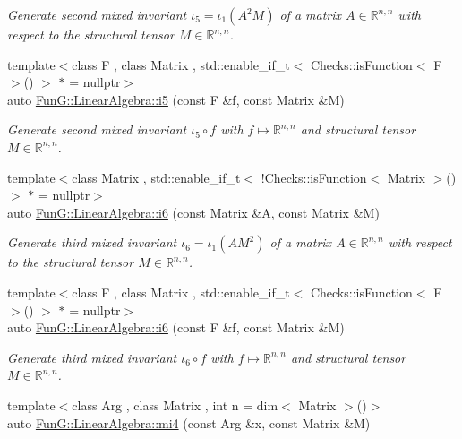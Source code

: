 \begin{DoxyCompactItemize}
\begin{DoxyCompactList}\small\item\em Generate second mixed invariant $ \iota_5=\iota_1(A^2M) $ of a matrix $A\in\mathbb{R}^{n,n}$ with respect to the structural tensor $M\in\mathbb{R}^{n,n}$. \end{DoxyCompactList}\item 
{\footnotesize template$<$class F , class Matrix , std\+::enable\+\_\+if\+\_\+t$<$ Checks\+::is\+Function$<$ F $>$() $>$ $\ast$  = nullptr$>$ }\\auto \hyperlink{group__InvariantGroup_gaed7e47c39d89f2b01e25c992da78b44d}{Fun\+G\+::\+Linear\+Algebra\+::i5} (const F \&f, const Matrix \&M)
\begin{DoxyCompactList}\small\item\em Generate second mixed invariant $ \iota_5\circ f $ with $f\mapsto\mathbb{R}^{n,n}$ and structural tensor $M\in\mathbb{R}^{n,n}$. \end{DoxyCompactList}\item 
{\footnotesize template$<$class Matrix , std\+::enable\+\_\+if\+\_\+t$<$ !\+Checks\+::is\+Function$<$ Matrix $>$() $>$ $\ast$  = nullptr$>$ }\\auto \hyperlink{group__InvariantGroup_gad9f0627946667bb052212f65ecdd002b}{Fun\+G\+::\+Linear\+Algebra\+::i6} (const Matrix \&A, const Matrix \&M)
\begin{DoxyCompactList}\small\item\em Generate third mixed invariant $ \iota_6=\iota_1(AM^2) $ of a matrix $A\in\mathbb{R}^{n,n}$ with respect to the structural tensor $M\in\mathbb{R}^{n,n}$. \end{DoxyCompactList}\item 
{\footnotesize template$<$class F , class Matrix , std\+::enable\+\_\+if\+\_\+t$<$ Checks\+::is\+Function$<$ F $>$() $>$ $\ast$  = nullptr$>$ }\\auto \hyperlink{group__InvariantGroup_ga2536c80df733bb3e089487202c3688c1}{Fun\+G\+::\+Linear\+Algebra\+::i6} (const F \&f, const Matrix \&M)
\begin{DoxyCompactList}\small\item\em Generate third mixed invariant $ \iota_6\circ f $ with $f\mapsto\mathbb{R}^{n,n}$ and structural tensor $M\in\mathbb{R}^{n,n}$. \end{DoxyCompactList}\item 
{\footnotesize template$<$class Arg , class Matrix , int n = dim$<$ Matrix $>$()$>$ }\\auto \hyperlink{group__InvariantGroup_ga7ee54c5d056877bdefefb8e54ad17791}{Fun\+G\+::\+Linear\+Algebra\+::mi4} (const Arg \&x, const Matrix \&M)

\end{DoxyCompactItemize}
